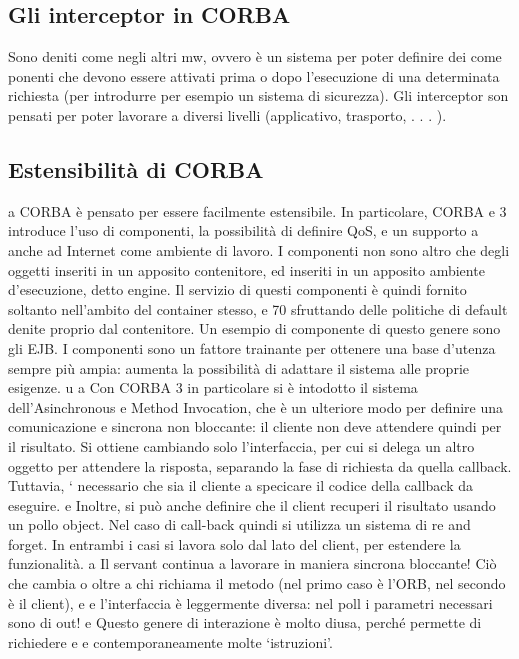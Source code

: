 \documentclass[a4paper,12pt]{article}
\begin{document}
\subsection{Gli interceptor in CORBA}
Sono deniti come negli altri mw, ovvero è un sistema per poter definire dei come
ponenti che devono essere attivati prima o dopo l'esecuzione di una determinata
richiesta (per introdurre per esempio un sistema di sicurezza). Gli interceptor
son pensati per poter lavorare a diversi livelli (applicativo, trasporto, . . . ).
\subsection{Estensibilità di CORBA}
a
CORBA è pensato per essere facilmente estensibile. In particolare, CORBA
e
3 introduce l'uso di componenti, la possibilità di definire QoS, e un supporto
a
anche ad Internet come ambiente di lavoro.
I componenti non sono altro che degli oggetti inseriti in un apposito contenitore, ed inseriti in un apposito ambiente
d'esecuzione, detto engine. Il servizio
di questi componenti è quindi fornito soltanto nell'ambito del container stesso,
e
70
sfruttando delle politiche di default denite proprio dal contenitore. Un esempio
di componente di questo genere sono gli EJB.
I componenti sono un fattore trainante per ottenere una base d'utenza sempre più ampia: aumenta la possibilità di
adattare il sistema alle proprie esigenze.
u
a
Con CORBA 3 in particolare si è intodotto il sistema dell'Asinchronous
e
Method Invocation, che è un ulteriore modo per definire una comunicazione
e
sincrona non bloccante: il cliente non deve attendere quindi per il risultato.
Si ottiene cambiando solo l'interfaccia, per cui si delega un altro oggetto per
attendere la risposta, separando la fase di richiesta da quella callback. Tuttavia,
` necessario che sia il cliente a specicare il codice della callback da eseguire.
e
Inoltre, si può anche definire che il client recuperi il risultato usando un pollo
object. Nel caso di call-back quindi si utilizza un sistema di re and forget. In
entrambi i casi si lavora solo dal lato del client, per estendere la funzionalità.
a
Il servant continua a lavorare in maniera sincrona bloccante! Ciò che cambia
o
oltre a chi richiama il metodo (nel primo caso è l'ORB, nel secondo è il client),
e
e
l'interfaccia è leggermente diversa: nel poll i parametri necessari sono di out!
e
Questo genere di interazione è molto diusa, perché permette di richiedere
e
e
contemporaneamente molte {`}istruzioni'.
\end{document}
